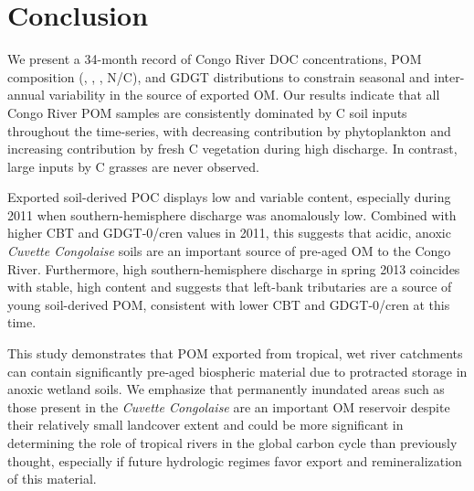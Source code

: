 \section{Conclusion}

We present a 34-month record of Congo River DOC concentrations, POM composition (, , , N/C), and GDGT distributions to constrain seasonal and inter-annual variability in the source of exported OM. Our results indicate that all Congo River POM samples are consistently dominated by C soil inputs throughout the time-series, with decreasing contribution by phytoplankton and increasing contribution by fresh C vegetation during high discharge. In contrast, large inputs by C grasses are never observed.

Exported soil-derived POC displays low and variable  content, especially during 2011 when southern-hemisphere discharge was anomalously low. Combined with higher CBT and GDGT-0/cren values in 2011, this suggests that acidic, anoxic \textit{Cuvette Congolaise} soils are an important source of pre-aged OM to the Congo River. Furthermore, high southern-hemisphere discharge in spring 2013 coincides with stable, high  content and suggests that left-bank tributaries are a source of young soil-derived POM, consistent with lower CBT and GDGT-0/cren at this time.

This study demonstrates that POM exported from tropical, wet river catchments can contain significantly pre-aged biospheric material due to protracted storage in anoxic wetland soils. We emphasize that permanently inundated areas such as those present in the \textit{Cuvette Congolaise} are an important OM reservoir despite their relatively small landcover extent and could be more significant in determining the role of tropical rivers in the global carbon cycle than previously thought, especially if future hydrologic regimes favor export and remineralization of this material.


